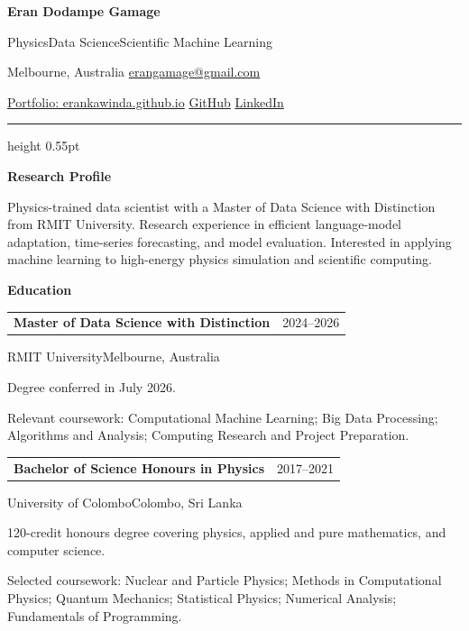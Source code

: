 \documentclass[10pt,a4paper]{article}
\makeatletter
\newcommand{\contactsep}{\hspace{0.55em}\textcolor{hairline}{\textbullet}\hspace{0.55em}}
\newcommand{\cvsection}[1]{%
  \par\vspace{0.78em}%
  {\sffamily\bfseries\color{accent}\fontsize{11.3}{13.2}\selectfont #1}\par
  \vspace{0.3em}}
\newcommand{\cventry}[3]{%
  \par\noindent
  \begin{tabularx}{\textwidth}{@{}>{\raggedright\arraybackslash}X
    >{\raggedleft\arraybackslash\sffamily\leavevmode\color{accent}}p{3.25cm}@{}}
    \textbf{#1} & {\small #2}
  \end{tabularx}\par\vspace{-0.08em}%
  {\small\sffamily\color{muted}#3}\par\vspace{0.12em}}
\newenvironment{cvitems}{%
  \begin{list}{\textcolor{accent}{\raisebox{0.15ex}{\scriptsize\textbullet}}}{%
    \setlength{\leftmargin}{1.18em}\setlength{\labelsep}{0.42em}%
    \setlength{\itemsep}{1.4pt}\setlength{\topsep}{2.2pt}%
    \setlength{\parsep}{0pt}\setlength{\partopsep}{0pt}}%
}{\end{list}}
\makeatother
\begin{document}
\fontsize{10.15}{12.55}\selectfont

{\sffamily\bfseries\fontsize{25}{28}\selectfont Eran Dodampe Gamage}\par
\vspace{0.16em}
{\sffamily\color{accent}\fontsize{10.2}{12}\selectfont
Physics\contactsep Data Science\contactsep Scientific Machine Learning}\par
\vspace{0.32em}
{\small\sffamily\color{muted}
Melbourne, Australia\contactsep
\href{mailto:erangamage@gmail.com}{erangamage@gmail.com}}\par
\vspace{0.16em}
{\small\sffamily
\href{https://erankawinda.github.io/}{Portfolio: erankawinda.github.io}\contactsep
\href{https://github.com/erankawinda}{GitHub}\contactsep
\href{https://www.linkedin.com/in/eran-gamage/}{LinkedIn}}\par
\vspace{0.55em}
{\color{hairline}\hrule height 0.55pt}

\cvsection{Research Profile}
Physics-trained data scientist with a Master of Data Science with Distinction
from RMIT University. Research experience in efficient language-model adaptation,
time-series forecasting, and model evaluation. Interested in applying machine
learning to high-energy physics simulation and scientific computing.

\cvsection{Education}
\cventry{Master of Data Science with Distinction}{2024--2026}
  {RMIT University\contactsep Melbourne, Australia}
\begin{cvitems}
  \item Degree conferred in July 2026.
  \item Relevant coursework: Computational Machine Learning; Big Data Processing;
  Algorithms and Analysis; Computing Research and Project Preparation.
\end{cvitems}
\cventry{Bachelor of Science Honours in Physics}{2017--2021}
  {University of Colombo\contactsep Colombo, Sri Lanka}
\begin{cvitems}
  \item 120-credit honours degree covering physics, applied and pure mathematics,
  and computer science.
  \item Selected coursework: Nuclear and Particle Physics; Methods in Computational
  Physics; Quantum Mechanics; Statistical Physics; Numerical Analysis;
  Fundamentals of Programming.
\end{cvitems}
\end{document}
